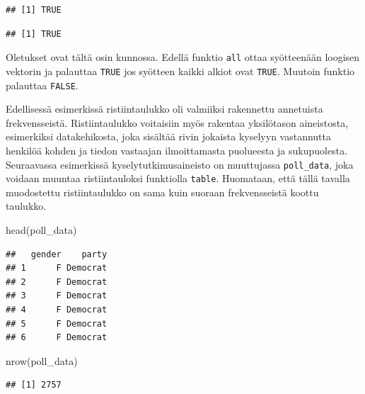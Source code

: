 \documentclass[
]{book}
\newenvironment{Shaded}{\begin{snugshade}}{\end{snugshade}}
\newcommand{\DecValTok}[1]{\textcolor[rgb]{0.00,0.00,0.81}{#1}}
\newcommand{\FloatTok}[1]{\textcolor[rgb]{0.00,0.00,0.81}{#1}}
\newcommand{\FunctionTok}[1]{\textcolor[rgb]{0.00,0.00,0.00}{#1}}
\newcommand{\NormalTok}[1]{#1}
\newcommand{\SpecialCharTok}[1]{\textcolor[rgb]{0.00,0.00,0.00}{#1}}
\begin{document}
\begin{verbatim}
## [1] TRUE
\end{verbatim}

\begin{Shaded}
\end{Shaded}

\begin{verbatim}
## [1] TRUE
\end{verbatim}

Oletukset ovat tältä osin kunnossa. Edellä funktio \texttt{all} ottaa syötteenään loogisen vektorin ja palauttaa \texttt{TRUE} jos syötteen kaikki alkiot ovat \texttt{TRUE}. Muutoin funktio palauttaa \texttt{FALSE}.

Edellisessä esimerkissä ristiintaulukko oli valmiiksi rakennettu annetuista frekvensseistä. Ristiintaulukko voitaisiin myös rakentaa yksilötason aineistosta, esimerkiksi datakehikosta, joka sisältää rivin jokaista kyselyyn vastannutta henkilöä kohden ja tiedon vastaajan ilmoittamasta puolueesta ja sukupuolesta. Seuraavassa esimerkissä kyselytutkimusaineisto on muuttujassa \texttt{poll\_data}, joka voidaan muuntaa ristiintauloksi funktiolla \texttt{table}. Huomataan, että tällä tavalla muodostettu ristiintaulukko on sama kuin suoraan frekvensseistä koottu taulukko.

\begin{Shaded}
\begin{Highlighting}[]
\FunctionTok{head}\NormalTok{(poll\_data)}
\end{Highlighting}
\end{Shaded}

\begin{verbatim}
##   gender    party
## 1      F Democrat
## 2      F Democrat
## 3      F Democrat
## 4      F Democrat
## 5      F Democrat
## 6      F Democrat
\end{verbatim}

\begin{Shaded}
\begin{Highlighting}[]
\FunctionTok{nrow}\NormalTok{(poll\_data)}
\end{Highlighting}
\end{Shaded}

\begin{verbatim}
## [1] 2757
\end{verbatim}
\end{document}
